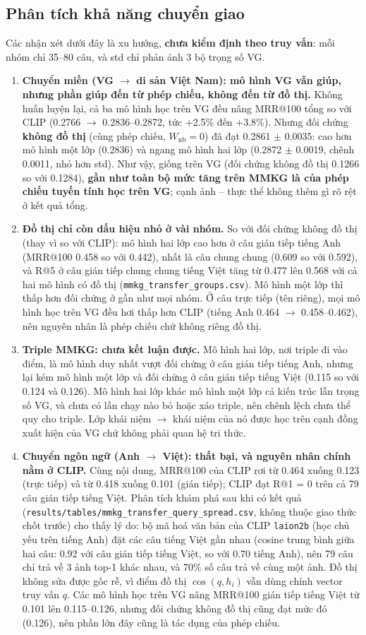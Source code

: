 \documentclass[12pt, a4paper]{article}
\makeatletter
\newcommand{\code}[1]{\texttt{#1}}
\newcommand{\mrr}{MRR@100}
\newcommand{\pmm}{\ensuremath{\pm}}
\makeatother
\begin{document}
\subsection{Phân tích khả năng chuyển giao}
Các nhận xét dưới đây là xu hướng, \textbf{chưa kiểm định theo truy vấn}: mỗi nhóm chỉ 35--80 câu, và std chỉ phản ánh 3 bộ trọng số VG.
\begin{enumerate}[leftmargin=*]
\item \textbf{Chuyển miền (VG $\to$ di sản Việt Nam): mô hình VG vẫn giúp, nhưng phần giúp đến từ phép chiếu, không đến từ đồ thị.} Không huấn luyện lại, cả ba mô hình học trên VG đều nâng \mrr{} tổng so với CLIP (0.2766 $\to$ 0.2836--0.2872, tức +2.5\% đến +3.8\%). Nhưng đối chứng \textbf{không đồ thị} (cùng phép chiếu, $W_{\text{nb}}=0$) đã đạt 0.2861 \pmm{} 0.0035: cao hơn mô hình một lớp (0.2836) và ngang mô hình hai lớp (0.2872 \pmm{} 0.0019, chênh 0.0011, nhỏ hơn std). Như vậy, giống trên VG (đối chứng không đồ thị 0.1266 so với 0.1284), \textbf{gần như toàn bộ mức tăng trên MMKG là của phép chiếu tuyến tính học trên VG}; cạnh ảnh -- thực thể không thêm gì rõ rệt ở kết quả tổng.
\item \textbf{Đồ thị chỉ còn dấu hiệu nhỏ ở vài nhóm.} So với đối chứng không đồ thị (thay vì so với CLIP): mô hình hai lớp cao hơn ở câu gián tiếp tiếng Anh (\mrr{} 0.458 so với 0.442), nhất là câu chung chung (0.609 so với 0.592), và R@5 ở câu gián tiếp chung chung tiếng Việt tăng từ 0.477 lên 0.568 với cả hai mô hình có đồ thị (\code{mmkg\_transfer\_groups.csv}). Mô hình một lớp thì thấp hơn đối chứng ở gần như mọi nhóm. Ở câu trực tiếp (tên riêng), mọi mô hình học trên VG đều hơi thấp hơn CLIP (tiếng Anh 0.464 $\to$ 0.458--0.462), nên nguyên nhân là phép chiếu chứ không riêng đồ thị.
\item \textbf{Triple MMKG: chưa kết luận được.} Mô hình hai lớp, nơi triple đi vào điểm, là mô hình duy nhất vượt đối chứng ở câu gián tiếp tiếng Anh, nhưng lại kém mô hình một lớp và đối chứng ở câu gián tiếp tiếng Việt (0.115 so với 0.124 và 0.126). Mô hình hai lớp khác mô hình một lớp cả kiến trúc lẫn trọng số VG, và chưa có lần chạy nào bỏ hoặc xáo triple, nên chênh lệch chưa thể quy cho triple. Lớp khái niệm $\to$ khái niệm của nó được học trên cạnh đồng xuất hiện của VG chứ không phải quan hệ tri thức.
\item \textbf{Chuyển ngôn ngữ (Anh $\to$ Việt): thất bại, và nguyên nhân chính nằm ở CLIP.} Cùng nội dung, \mrr{} của CLIP rơi từ 0.464 xuống 0.123 (trực tiếp) và từ 0.418 xuống 0.101 (gián tiếp); CLIP đạt R@1 = 0 trên cả 79 câu gián tiếp tiếng Việt. Phân tích khám phá sau khi có kết quả (\code{results/tables/mmkg\_transfer\_query\_spread.csv}, không thuộc giao thức chốt trước) cho thấy lý do: bộ mã hoá văn bản của CLIP \code{laion2b} (học chủ yếu trên tiếng Anh) đặt các câu tiếng Việt gần nhau (cosine trung bình giữa hai câu: 0.92 với câu gián tiếp tiếng Việt, so với 0.70 tiếng Anh), nên 79 câu chỉ trả về 3 ảnh top-1 khác nhau, và 70\% số câu trả về cùng một ảnh. Đồ thị không sửa được gốc rễ, vì điểm đồ thị $\cos(q, h_i)$ vẫn dùng chính vector truy vấn $q$. Các mô hình học trên VG nâng \mrr{} gián tiếp tiếng Việt từ 0.101 lên 0.115--0.126, nhưng đối chứng không đồ thị cũng đạt mức đó (0.126), nên phần lớn đây cũng là tác dụng của phép chiếu.

\end{enumerate}
\end{document}
